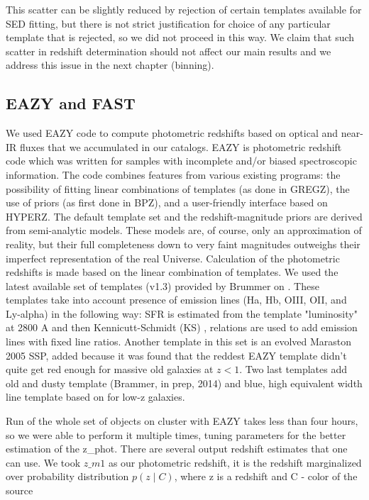 This scatter can be slightly reduced by rejection of certain templates available for SED fitting, but there is not strict justification for choice of any particular template that is rejected, so we did not proceed in this way. We claim that such scatter in redshift determination should not affect our main results and we address this issue in the next chapter (binning).

\subsection{EAZY and FAST}

We used EAZY code to compute photometric redshifts based on optical and near-IR fluxes that we accumulated in our catalogs. EAZY \citep{Brammer2008} is photometric redshift code which was written for samples with incomplete and/or biased spectroscopic information. The code combines features from various existing programs: the possibility of fitting linear  combinations of templates (as done in GREGZ), the use of priors (as first done in BPZ), and a user-friendly interface based on HYPERZ. The default template set and the redshift-magnitude priors are derived from semi-analytic models. These models are, of course, only an approximation of reality, but their full completeness down to very faint magnitudes outweighs their imperfect representation of the real Universe. 
Calculation of the photometric redshifts is made based on the linear combination of templates. We used the latest available set of templates (v1.3) provided by Brummer on . These templates take into account presence of emission lines (Ha, Hb, OIII, OII, and Ly-alpha) in the following way: SFR  is estimated from the template "luminosity" at 2800 A and then Kennicutt-Schmidt (KS) {\citep{Schmidt1959}}, {\citep{Kennicutt1998b}} relations are used to add emission lines with fixed line ratios. Another template in this set is an evolved Maraston 2005 SSP, added because it was found that the reddest EAZY template didn't quite get red enough for massive old galaxies at $z<1$. Two last templates add old and dusty template (Brammer, in prep, 2014) and blue, high equivalent width line template based on \citep{2010ApJ...719.1168E} for low-z galaxies.

Run of the whole set of objects on cluster with EAZY takes less than four hours, so we were able to perform it multiple times, tuning parameters for the better estimation of the z\_phot. There are several output redshift estimates that one can use.
We took $z\_{m1}$ as our photometric redshift,  it is the redshift marginalized over probability distribution $p(z\mid C)$, where z is a redshift and C - color of the source

